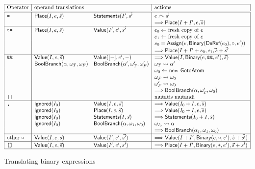 \begin{docpart}
\begin{figure}\begin{displaymath}\begin{array}{|l|ll|l|}
\hline
\mbox{Operator} & \multicolumn{2}{l|}{\mbox{operand translations}}
   & \mbox{actions} \\
\hline
\hline
\syntax{=} & \cons{Place}(I,e,\vec s) & \cons{Statements}(I',\vec {s'} &
    \installleft{e}{\vec{s'}} \\
&&& ==>\cons{Place}(I+I',e,\vec s) \\
\hline
\circ\syntax{=} & \cons{Place}(I,e,\vec s) & \cons{Value}(I',e',\vec{s'} &
    e_0 <- \mbox{fresh copy of }e \\
&&& e_1 <- \mbox{fresh copy of }e \\
&&& s_0 = \cons{Assign}(e,\cons{Binary}(\cons{DeRef}(e_0),\circ,e')) \\
&&& ==> \cons{Place}(I+I'+s_0,e_1,\vec s + \vec{s'} \\
\hline
\verb.&&. & \cons{Value}(I,e,\vec s) & \cons{Value}([-],e',-) &
    ==> \cons{Value}(I,\cons{Binary}(e,\syntax{\&\&},e'),\vec s) \\
& \cons{BoolBranch}(\alpha,\omega_T,\omega_F)
& \cons{BoolBranch}(\alpha',\omega'_T,\omega'_F) &
    \atomconnect{\omega_T}{\alpha'} \\
&&& \omega_0 <- \mbox{new \cons{GotoAtom}} \\
&&& \atomconnect{\omega_F}{\omega_0} \\
&&& \atomconnect{\omega'_F}{\omega_0} \\
&&& ==> \cons{BoolBranch}(\alpha,\omega'_T,\omega_0) \\
\verb.||. & & & \mbox{mutatis mutandi} \\
\hline
\syntax{,} & \cons{Ignored}(I_0) & \cons{Value}(I,e,\vec s) &
    ==> \cons{Value}(I_0+I,e,\vec s) \\
& \cons{Ignored}(I_0) & \cons{Place}(I,e,\vec s) &
    ==> \cons{Value}(I_0+I,e,\vec s) \\
& \cons{Ignored}(I_0) & \cons{Statements}(I,\vec s) &
    ==> \cons{Statements}(I_0 + I,\vec s) \\
& \cons{Ignored}(I_0) & \cons{BoolBranch}(\alpha,\omega_1,\omega_0) &
    \atomconnect{\omega_{I_0}}{\alpha} \\
&&& ==> \cons{BoolBranch}(\alpha_I,\omega_1,\omega_0) \\
\hline
\mbox{other } \circ & \cons{Value}(I,e,\vec s) & \cons{Value}(I',e',\vec{s'}) &
    ==> \cons{Value}(I+I',\cons{Binary}(e,\circ,e'),\vec s+\vec{s'}) \\
\hline
\syntax{[]} & \cons{Value}(I,e,\vec s) & \cons{Value}(I',e',\vec{s'}) &
    ==> \cons{Place}(I+I',\cons{Binary}(e,\syntax{+},e'),\vec s+\vec{s'}) \\
\hline
\end{array}\end{displaymath}
\caption{Translating binary expressions}
\label{fig:c2coreBinary}
\end{figure}


\end{docpart}
